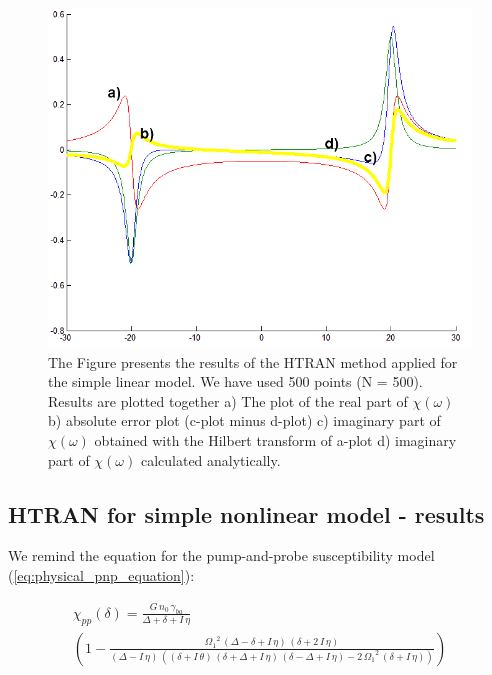 \documentclass[12pt,twoside,a4paper]{article}
\numberwithin{equation}{subsection}
\numberwithin{figure}{subsection}
\begin{document}
\begin{figure} 
  \includegraphics[width=150mm]{img/htran_lin.png}
  \caption{The Figure presents the results of the HTRAN method applied for the simple linear model. We have used 500 points (N = 500).
  Results are plotted together 
   a) The plot of the real part of $\chi (\omega )$ 
   b) absolute error plot (c-plot minus d-plot) 
   c) imaginary part of $\chi (\omega )$ obtained with the Hilbert transform of a-plot 
   d) imaginary part of $\chi (\omega )$ calculated analytically. \label{eq:htran_lin}
  }
\end{figure}

\subsection{HTRAN for simple nonlinear model - results} \label{chap:htran_nlo}

We remind the equation for the pump-and-probe susceptibility model (\ref{eq:physical_pnp_equation}): 

\begin{multline} \label{eq:htran_fparameters}
  \chi_{pp} (\delta ) = \frac {G\,{n_{0}}\,{\gamma_{ba}}}{\Delta + \delta + I\,\eta } \\
    \left(  
    	1 - \frac{{\Omega_{1}}^{2}\,(\Delta - \delta + I \, \eta ) \, (\delta + 2 \, I \, \eta )}
    	         {(\Delta  - I \, \eta) \, ((\delta + I \, \theta ) \, (\delta + \Delta + I \, \eta ) 
    	           \, (\delta - \Delta  + I\,\eta ) - 2 \, {\Omega_{1}}^{2} \, (\delta  + I \, \eta ))} 
    \right) 
\end{multline}
\end{document}
